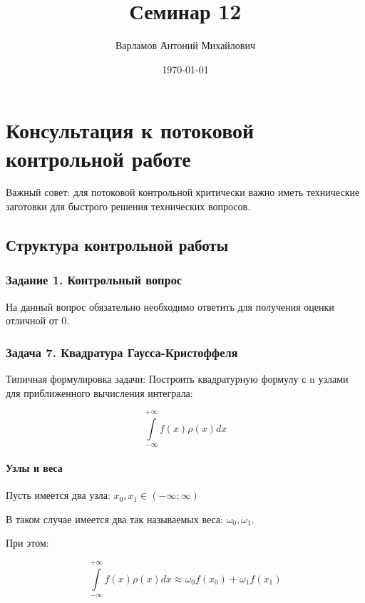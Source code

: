 \documentclass[10pt,a4paper]{article}
\title{Семинар 12}
\date{\today}
\author{Варламов Антоний Михайлович}
\begin{document}
	\maketitle
	
	\section{Консультация к потоковой контрольной работе}
	
	Важный совет: для потоковой контрольной критически важно иметь технические 
	заготовки для быстрого решения технических вопросов.
	
	\subsection{Структура контрольной работы}
	
	\subsubsection{Задание 1. Контрольный вопрос}
	На данный вопрос обязательно необходимо ответить для получения оценки 
	отличной от 0.
	
	\subsubsection{Задача 7. Квадратура Гаусса-Кристоффеля}
	
	Типичная формулировка задачи: Построить квадратурную формулу с n узлами для
	приближенного вычисления интеграла:
	
	\begin{equation}
		\int\limits_{-\infty}^{+\infty}f\left(x\right)\rho\left(x\right)dx
	\end{equation}
	
	\paragraph{Узлы и веса}
	
	Пусть имеется два узла: $x_{0}, x_{1} \in \left(-\infty; \infty\right)$
	
	В таком случае имеется два так называемых веса: $\omega_{0}, \omega_{1}.$ 
	
	При этом:
	
	\begin{equation}
		\int\limits_{-\infty}^{+\infty}f\left(x\right)\rho\left(x\right)dx 
		\approx \omega_{0}f\left(x_{0}\right) + \omega_{1}f\left(x_{1}\right)
	\end{equation}
	
\end{document}

